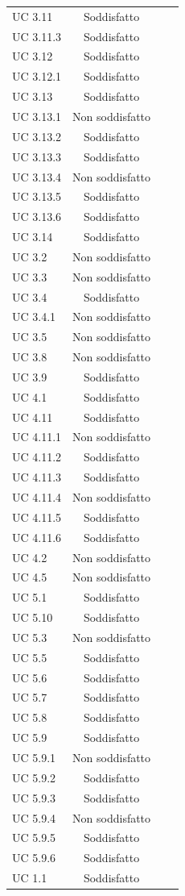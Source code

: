 \begin{longtable}{C{4cm} c c c}
UC 3.11 & Soddisfatto \\
UC 3.11.3 & Soddisfatto \\
UC 3.12 & Soddisfatto \\
UC 3.12.1 & Soddisfatto \\
UC 3.13 & Soddisfatto \\
UC 3.13.1 & Non soddisfatto \\
UC 3.13.2 & Soddisfatto \\
UC 3.13.3 & Soddisfatto \\
UC 3.13.4 & Non soddisfatto \\
UC 3.13.5 & Soddisfatto \\
UC 3.13.6 & Soddisfatto \\
UC 3.14 & Soddisfatto \\
UC 3.2 & Non soddisfatto \\
UC 3.3 & Non soddisfatto \\
UC 3.4 & Soddisfatto \\
UC 3.4.1 & Non soddisfatto \\
UC 3.5 & Non soddisfatto \\
UC 3.8 & Non soddisfatto \\
UC 3.9 & Soddisfatto \\
UC 4.1 & Soddisfatto \\
UC 4.11 & Soddisfatto \\
UC 4.11.1 & Non soddisfatto \\
UC 4.11.2 & Soddisfatto \\
UC 4.11.3 & Soddisfatto \\
UC 4.11.4 & Non soddisfatto \\
UC 4.11.5 & Soddisfatto \\
UC 4.11.6 & Soddisfatto \\
UC 4.2 & Non soddisfatto \\
UC 4.5 & Non soddisfatto \\
UC 5.1 & Soddisfatto \\
UC 5.10 & Soddisfatto \\
UC 5.3 & Non soddisfatto \\
UC 5.5 & Soddisfatto \\
UC 5.6 & Soddisfatto \\
UC 5.7 & Soddisfatto \\
UC 5.8 & Soddisfatto \\
UC 5.9 & Soddisfatto \\
UC 5.9.1 & Non soddisfatto \\
UC 5.9.2 & Soddisfatto \\
UC 5.9.3 & Soddisfatto \\
UC 5.9.4 & Non soddisfatto \\
UC 5.9.5 & Soddisfatto \\
UC 5.9.6 & Soddisfatto \\
UC 1.1 & Soddisfatto \\
\end{longtable}
